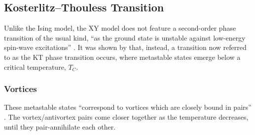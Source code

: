 	\subsection{Kosterlitz–Thouless Transition}
		Unlike the Ising model, the XY model does not feature a second-order phase transition of the usual kind, \enquote{as the ground state is unstable against low-energy spin-wave excitations} \cite[p. 1190]{kosterlitz}. It was shown by \cite{kosterlitz} that, instead, a transition now referred to as the KT phase transition occurs, where metastable states emerge below a critical temperature, $T_C$.
	
		\subsubsection{Vortices}
			These metastable states \enquote{correspond to vortices which are closely bound in pairs} \cite[p. 1190]{kosterlitz}. The vortex/antivortex pairs come closer together as the temperature decreases, until they pair-annihilate each other.